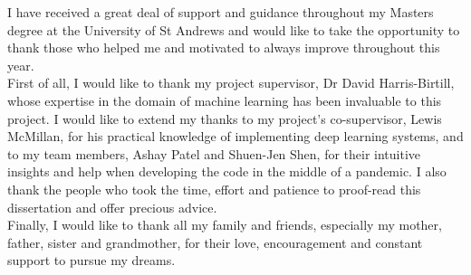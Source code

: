 I have received a great deal of support and guidance throughout my Masters degree at the University of St Andrews and would like to take the opportunity to thank those who helped me and motivated to always improve throughout this year.\\

First of all, I would like to thank my project supervisor, Dr David Harris-Birtill, whose expertise in the domain of machine learning has been invaluable to this project. I would like to extend my thanks to my project's co-supervisor, Lewis McMillan, for his practical knowledge of implementing deep learning systems, and to my team members, Ashay Patel and Shuen-Jen Shen, for their intuitive insights and help when developing the code in the middle of a pandemic. I also thank the people who took the time, effort and patience to proof-read this dissertation and offer precious advice.\\

Finally, I would like to thank all my family and friends, especially my mother, father, sister and grandmother, for their love, encouragement and constant support to pursue my dreams.
